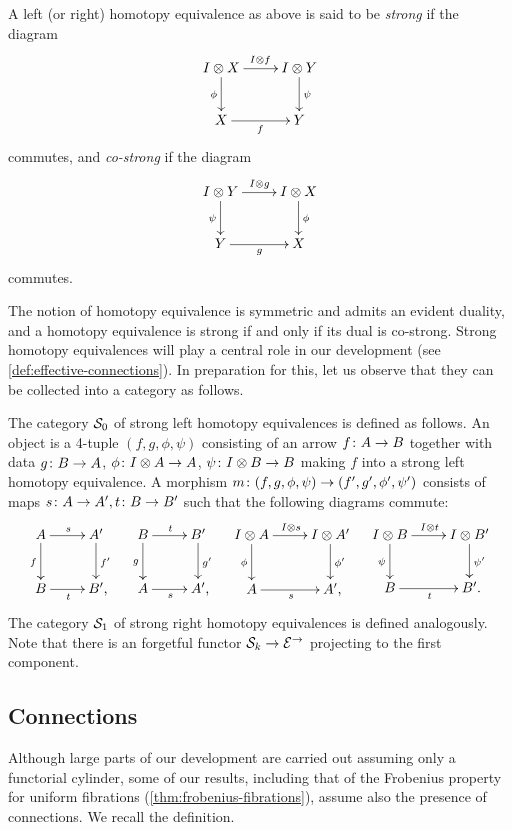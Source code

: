 \documentclass[reqno,10pt,a4paper,oneside]{amsart}
\begin{document}
\begin{definition} \label{def:strhe}
A left (or right) homotopy equivalence as above is said to be \emph{strong} if the diagram
\[
\xymatrix{
  \interval \otimes X \ar[r]^{\interval \otimes f} \ar[d]_{\phi} & \interval \otimes Y \ar[d]^{\psi} \\
  X \ar[r]_{f} & Y
}
\]
commutes, and \emph{co-strong} if the diagram
\[
  \xymatrix{
  \interval \otimes Y \ar[r]^{\interval \otimes g} \ar[d]_{\psi} & \interval \otimes X \ar[d]^{\phi} \\
  Y \ar[r]_{g} & X
}
\]
commutes.
\end{definition}

The notion of homotopy equivalence is symmetric and admits an evident duality, and a homotopy equivalence is strong if and only if its dual is co-strong.
Strong homotopy equivalences will play a central role in our development (see \cref{def:effective-connections}).
In preparation for this, let us observe that they can be collected into a category as follows.


The category $\cal{S}_0$ of strong left homotopy equivalences is defined as follows.
An object is a 4-tuple $(f, g, \phi, \psi)$ consisting of an arrow $f \co A \to B$ together with data $g \co B \to A$, $\phi \co \interval \otimes A \to A$, $\psi \co \interval \otimes B \to B$ making $f$ into a strong left homotopy equivalence.
A morphism $m \co (f, g, \phi, \psi) \to (f', g', \phi', \psi')$ consists of maps $s \co A \to A', t \co B \to B'$ such that the following diagrams commute:
\begin{align*}
\xymatrix{
  A
  \ar[r]^{s}
  \ar[d]_{f}
&
  A'
  \ar[d]^{f'}
\\
  B
  \ar[r]_{t}
&
  B'\rlap{,}
}
&&
\xymatrix{
  B
  \ar[r]^{t}
  \ar[d]_{g}
&
  B'
  \ar[d]^{g'}
\\
  A
  \ar[r]_{s}
&
  A'\rlap{,}
}
&&
\xymatrix{
  \interval \otimes A
  \ar[d]_{\phi}
  \ar[r]^{\interval \otimes s}
&
  I \otimes A'
  \ar[d]^{\phi'}
\\
  A
  \ar[r]_{s}
&
  A' \rlap{,}
}
&&
\xymatrix{
  \interval \otimes B
  \ar[d]_{\psi}
  \ar[r]^{\interval \otimes t}
&
  I \otimes B'
  \ar[d]^{\psi'}
\\
  B
  \ar[r]_{t}
&
  B' \rlap{.}
}
\end{align*}
The category $\cal{S}_1$ of strong right homotopy equivalences is defined analogously.
Note that there is an forgetful functor $\cal{S}_k \to \catE^\to$ projecting to the first component.


\subsection*{Connections} Although large parts of our development are carried out assuming only a functorial cylinder, some of our results, including that of the Frobenius property for uniform fibrations (\cref{thm:frobenius-fibrations}), assume also the presence of connections.
We recall the definition.
\end{document}
